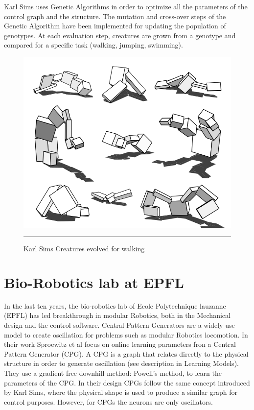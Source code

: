 \newpage
Karl Sims uses Genetic Algorithms in order to optimize all the parameters of the control graph and the structure. The mutation and cross-over steps of the Genetic Algorithm have been implemented for updating the population of genotypes. At each evaluation step, creatures are grown from a genotype and compared for a specific task (walking, jumping, swimming). 

\begin{figure}[htbp]
    \centering
    \includegraphics[scale=0.3]{Figures/evolved_creature.png}
    \rule{35em}{0.5pt}
    \caption[Karl Sims Creatures evolved for walking]{Karl Sims Creatures evolved for walking}
    \label{fig:evolved_creature}
\end{figure}


\newpage
\section{Bio-Robotics lab at EPFL}

In the last ten years, the bio-robotics lab of Ecole Polytechnique lauzanne (EPFL) has led breakthrough in modular Robotics, both in the Mechanical design and the control software. 
Central Pattern Generators are a widely use model to create oscillation for problems such as modular Robotics locomotion. In their work Sproewitz et al \cite{sproewitz} focus on online learning parameters fron a Central Pattern Generator (CPG). A CPG is a graph that relates directly to the physical structure in order to generate oscillation (see description in Learning Models). They use a gradient-free downhill method: Powell's method, to learn the parameters of the CPG. In their design CPGs follow the same concept introduced by Karl Sims, where the physical shape is used to produce a similar graph for control purposes. However, for CPGs the neurons are only oscillators. 

